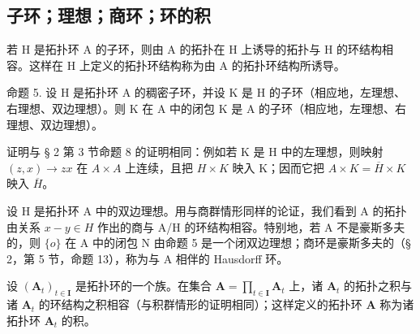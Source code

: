 \subsection{子环；理想；商环；环的积}

若 H 是拓扑环 A 的子环，则由 A 的拓扑在 H 上诱导的拓扑与 H 的环结构相容。这样在 H 上定义的拓扑环结构称为由 A 的拓扑环结构所诱导。

命题 5. 设 H 是拓扑环 A 的稠密子环，并设 K 是 H 的子环（相应地，左理想、右理想、双边理想）。则 K 在 A 中的闭包 K 是 A 的子环（相应地，左理想、右理想、双边理想）。

证明与 § 2 第 3 节命题 8 的证明相同：例如若 K 是 H 中的左理想，则映射 \((z, x) \to zx\) 在 \(A \times A\) 上连续，且把 \(H \times K\) 映入 K；因而它把 \(A \times K = \overline{H} \times K\) 映入 \(\overline{H}\)。

设 H 是拓扑环 A 中的双边理想。用与商群情形同样的论证，我们看到 A 的拓扑由关系 \(x - y \in H\) 作出的商与 A/H 的环结构相容。特别地，若 A 不是豪斯多夫的，则 \(\{o\}\) 在 A 中的闭包 N 由命题 5 是一个闭双边理想；商环是豪斯多夫的（§ 2，第 5 节，命题 13），称为与 A 相伴的 Hausdorff 环。

设 \((\mathbf{A}_t)_{t\in \mathbf{I}}\) 是拓扑环的一个族。在集合 \(\mathbf{A} = \prod_{t\in \mathbf{I}}\mathbf{A}_t\) 上，诸 \(\mathbf{A}_t\) 的拓扑之积与诸 \(\mathbf{A}_t\) 的环结构之积相容（与积群情形的证明相同）；这样定义的拓扑环 \(\mathbf{A}\) 称为诸拓扑环 \(\mathbf{A}_t\) 的积。

